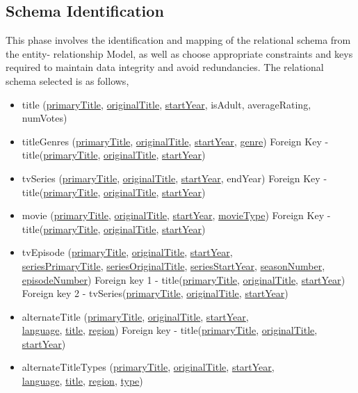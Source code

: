 \documentclass{sig-alternate}
\begin{document}
	\subsection{Schema Identification}
	This phase involves the identification and mapping of the relational schema from the entity- relationship Model, as well as choose appropriate constraints and keys required to maintain data integrity and avoid redundancies. The relational schema selected is as follows,\newline
        \begin{itemize}
	\item title (\underline{primaryTitle}, \underline{originalTitle}, \underline{startYear}, isAdult, averageRating, numVotes)
	\item titleGenres (\underline{primaryTitle}, \underline{originalTitle}, \underline{startYear}, \underline{genre}) \newline
	Foreign Key - title(\underline{primaryTitle}, \underline{originalTitle}, \underline{startYear})
	\item tvSeries (\underline{primaryTitle}, \underline{originalTitle}, \underline{startYear}, endYear)\newline
	Foreign Key - title(\underline{primaryTitle}, \underline{originalTitle}, \underline{startYear})
	\item movie (\underline{primaryTitle}, \underline{originalTitle}, \underline{startYear}, \underline{movieType})\newline
	Foreign Key - title(\underline{primaryTitle}, \underline{originalTitle}, \underline{startYear})
	\item tvEpisode (\underline{primaryTitle}, \underline{originalTitle}, \underline{startYear},\\ \underline{seriesPrimaryTitle}, \underline{seriesOriginalTitle}, \underline{seriesStartYear}, \underline{seasonNumber}, \underline{episodeNumber})\newline
	Foreign key 1 - title(\underline{primaryTitle}, \underline{originalTitle}, \underline{startYear})
	Foreign key 2 - tvSeries(\underline{primaryTitle}, \underline{originalTitle}, \underline{startYear})
	\item alternateTitle (\underline{primaryTitle}, \underline{originalTitle}, \underline{startYear},\\ \underline{language}, \underline{title}, \underline{region}) \newline
	Foreign key - title(\underline{primaryTitle}, \underline{originalTitle}, \underline{startYear})
	\item alternateTitleTypes (\underline{primaryTitle}, \underline{originalTitle}, \underline{startYear},\\ \underline{language}, \underline{title}, \underline{region}, \underline{type}) \newline

\end{itemize}
\end{document}
